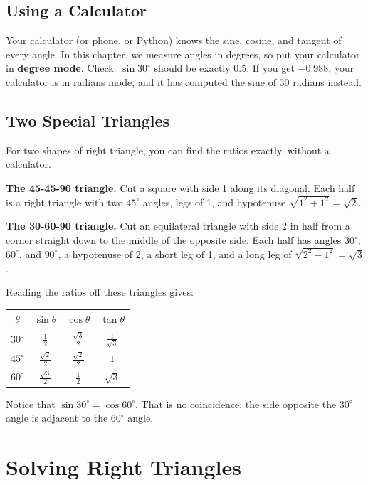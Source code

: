 \subsection{Using a Calculator}
Your calculator (or phone, or Python) knows the sine, cosine, and tangent of every
angle. In this chapter, we measure angles in degrees, so put your calculator in
\textbf{degree mode}. Check: $\sin 30^\circ$ should be exactly $0.5$. If you get
$-0.988$, your calculator is in radians mode, and it has computed the sine of 30
radians instead.

\subsection{Two Special Triangles}
For two shapes of right triangle, you can find the ratios exactly, without a
calculator.

\textbf{The 45-45-90 triangle.} Cut a square with side 1 along its diagonal. Each
half is a right triangle with two $45^\circ$ angles, legs of 1, and hypotenuse
$\sqrt{1^2 + 1^2} = \sqrt{2}$.

\textbf{The 30-60-90 triangle.} Cut an equilateral triangle with side 2 in half
from a corner straight down to the middle of the opposite side. Each half has
angles $30^\circ$, $60^\circ$, and $90^\circ$, a hypotenuse of 2, a short leg of
1, and a long leg of $\sqrt{2^2 - 1^2} = \sqrt{3}$.

Reading the ratios off these triangles gives:
\begin{center}
\begin{tabular}{c|c|c|c}
$\theta$ & $\sin\theta$ & $\cos\theta$ & $\tan\theta$ \\
\hline
$30^\circ$ & $\frac{1}{2}$ & $\frac{\sqrt{3}}{2}$ & $\frac{1}{\sqrt{3}}$ \\[3pt]
$45^\circ$ & $\frac{\sqrt{2}}{2}$ & $\frac{\sqrt{2}}{2}$ & $1$ \\[3pt]
$60^\circ$ & $\frac{\sqrt{3}}{2}$ & $\frac{1}{2}$ & $\sqrt{3}$ \\
\end{tabular}
\end{center}
Notice that $\sin 30^\circ = \cos 60^\circ$. That is no coincidence: the side
opposite the $30^\circ$ angle is adjacent to the $60^\circ$ angle.

\section{Solving Right Triangles}

